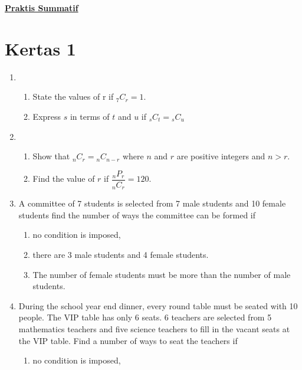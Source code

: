 \documentclass{report}
\newcommand\permtwo[2][^n]{{}_{#1}P_{#2}}
\newcommand\comb[2][^n]{{}_{#1}C_{#2}}
\begin{document}
\begin{multicols*}{2}
      \noindent\Large{\underline{\textbf{Praktis Summatif}}}
      \normalsize
      \setcounter{section}{0}
      \section{Kertas 1}
      \begin{enumerate}
            \item \begin{enumerate}
                        \item State the values of r if $\comb[7]{r} = 1$.
                        \item Express $s$ in terms of $t$ and $u$ if $\comb[s]{t} = \comb[s]{u}$
                  \end{enumerate}
            \item \begin{enumerate}
                        \item Show that $\comb[n]{r} = \comb[n]{n-r}$ where $n$ and $r$ are positive integers
                              and $n > r$.
                        \item Find the value of $r$ if $\dfrac{\permtwo[n]{r}}{\comb[n]{r}} = 120$.
                  \end{enumerate}
            \item A committee of 7 students is selected from 7 male students and 10 female
                  students find the number of ways the committee can be formed if
                  \begin{enumerate}
                        \item no condition is imposed,
                        \item there are 3 male students and 4 female students.
                        \item  The number of female students must be more than the number of male students.
                  \end{enumerate}
            \item During the school year end dinner, every round table must be seated with 10
                  people. The VIP table has only 6 seats. 6 teachers are selected from 5
                  mathematics teachers and five science teachers to fill in the vacant seats at
                  the VIP table. Find a number of ways to seat the teachers if
                  \begin{enumerate}
                        \item no condition is imposed,

\end{enumerate}
\end{enumerate}
\end{multicols*}
\end{document}
